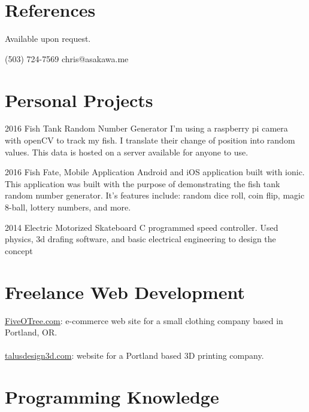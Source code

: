 \documentclass{tccv}
\begin{document}
\section{References}
Available upon request.

    {(503) 724-7569}
    {chris@asakawa.me}

\section{Personal Projects}

\begin{yearlist}

\item{2016}
     {Fish Tank Random Number Generator}
     {I'm using a raspberry pi camera with openCV to track my fish. I translate their change of position into random values. This data is hosted on a server available for anyone to use.  }

\item{2016}
     {Fish Fate, Mobile Application}
     {Android and iOS application built with ionic. This application was built with the purpose of demonstrating the fish tank random number generator. It's features include: random dice roll, coin flip, magic 8-ball, lottery numbers, and more. }


\item{2014}
     {Electric Motorized Skateboard}
     {C programmed speed controller. Used physics, 3d drafing software, and basic electrical engineering to design the concept}




\end{yearlist}

\section{Freelance Web Development}
\href{http://fiveotree.com/}{FiveOTree.com}: e-commerce web site for a small clothing company based in Portland, OR. \\ \\
\href{http://talusdesign3d.com/}{talusdesign3d.com}: 
website for a Portland based 3D printing company. 

\section{Programming Knowledge}
\end{document}

